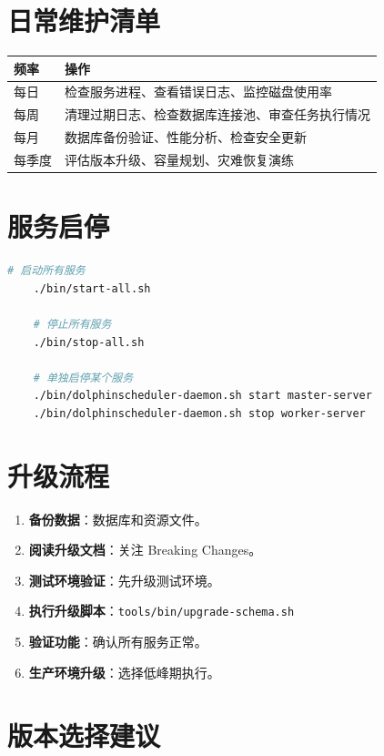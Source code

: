 \documentclass[UTF8, a4paper]{ctexbook}
\begin{document}
\section{日常维护清单}
	
\begin{longtable}{p{3cm}p{10cm}}
	\toprule
	\textbf{频率} & \textbf{操作} \\
	\midrule
	每日 & 检查服务进程、查看错误日志、监控磁盘使用率 \\
	每周 & 清理过期日志、检查数据库连接池、审查任务执行情况 \\
	每月 & 数据库备份验证、性能分析、检查安全更新 \\
	每季度 & 评估版本升级、容量规划、灾难恢复演练 \\
	\bottomrule
\end{longtable}
	
\section{服务启停}
	
\begin{lstlisting}[language=bash]
	# 启动所有服务
	./bin/start-all.sh
	
	# 停止所有服务
	./bin/stop-all.sh
	
	# 单独启停某个服务
	./bin/dolphinscheduler-daemon.sh start master-server
	./bin/dolphinscheduler-daemon.sh stop worker-server
\end{lstlisting}
	
\section{升级流程}
	
\begin{enumerate}
	\item \textbf{备份数据}：数据库和资源文件。
	\item \textbf{阅读升级文档}：关注 Breaking Changes。
	\item \textbf{测试环境验证}：先升级测试环境。
	\item \textbf{执行升级脚本}：\texttt{tools/bin/upgrade-schema.sh}
	\item \textbf{验证功能}：确认所有服务正常。
	\item \textbf{生产环境升级}：选择低峰期执行。
\end{enumerate}
	
\section{版本选择建议}
	
\end{document}
